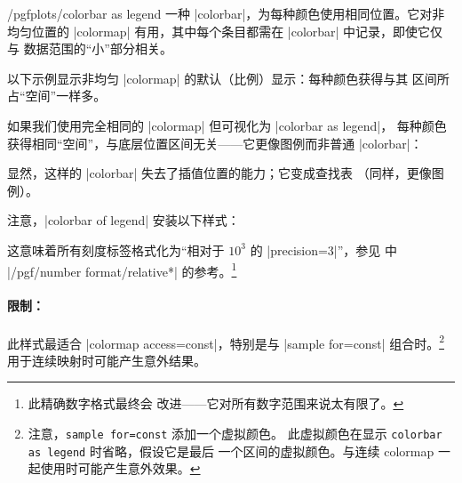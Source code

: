 \begin{stylekey}{/pgfplots/colorbar as legend}
    一种 |colorbar|，为每种颜色使用相同位置。它对非均匀位置的
    |colormap| 有用，其中每个条目都需在 |colorbar| 中记录，即使它仅与
    数据范围的``小''部分相关。

    以下示例显示非均匀 |colormap| 的默认（比例）显示：每种颜色获得与其
    区间所占``空间''一样多。
\begin{codeexample}[]
\pgfplotscolorbardrawstandalone[
    colorbar style={
        ticklabel style={font=\tiny},
    },
    colormap access=const,
    colormap={CM}{
        of colormap={
            viridis,
            target pos={
                0,200,300,350,375,
                400,700,800,850,1000
            },
            sample for=const,
        },
    },
]
\end{codeexample}

    如果我们使用完全相同的 |colormap| 但可视化为 |colorbar as legend|，
    每种颜色获得相同``空间''，与底层位置区间无关——它更像图例而非普通
    |colorbar|：
\begin{codeexample}[]
\pgfplotscolorbardrawstandalone[
    colorbar as legend,
    colorbar style={
        ticklabel style={font=\tiny},
    },
    colormap access=const,
    colormap={CM}{
        of colormap={
            viridis,
            target pos={
                0,200,300,350,375,
                400,700,800,850,1000
            },
            sample for=const,
        },
    },
]
\end{codeexample}
    \noindent 显然，这样的 |colorbar| 失去了插值位置的能力；它变成查找表
    （同样，更像图例）。

    注意，|colorbar of legend| 安装以下样式：
\begin{codeexample}
\end{codeexample}
    \noindent 这意味着所有刻度标签格式化为``相对于 $10^3$ 的
    |precision=3|''，参见 \PGFPlotstable{} 中
    |/pgf/number format/relative*| 的参考。\footnote{此精确数字格式最终会
    改进——它对所有数字范围来说太有限了。}


    \paragraph{限制：}

    此样式最适合 |colormap access=const|，特别是与 |sample for=const|
    组合时。\footnote{注意，\texttt{sample for=const} 添加一个虚拟颜色。
    此虚拟颜色在显示 \texttt{colorbar as legend} 时省略，假设它是最后
    一个区间的虚拟颜色。与连续 colormap 一起使用时可能产生意外效果。}
    用于连续映射时可能产生意外结果。
\end{stylekey}


